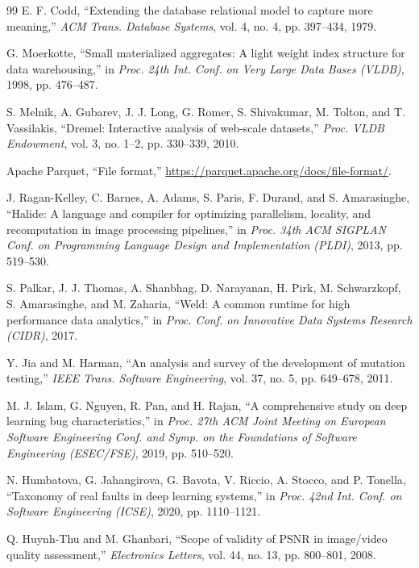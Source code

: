 \documentclass[conference]{IEEEtran}
\begin{document}
\begin{thebibliography}{99}
E. F. Codd, ``Extending the database relational model to capture more meaning,'' \emph{ACM Trans.
Database Systems}, vol. 4, no. 4, pp. 397--434, 1979.

G. Moerkotte, ``Small materialized aggregates: A light weight index structure for data
warehousing,'' in \emph{Proc. 24th Int. Conf. on Very Large Data Bases (VLDB)}, 1998, pp. 476--487.

S. Melnik, A. Gubarev, J. J. Long, G. Romer, S. Shivakumar, M. Tolton, and T. Vassilakis, ``Dremel:
Interactive analysis of web-scale datasets,'' \emph{Proc. VLDB Endowment}, vol. 3, no. 1--2,
pp. 330--339, 2010.

Apache Parquet, ``File format,'' \url{https://parquet.apache.org/docs/file-format/}.

J. Ragan-Kelley, C. Barnes, A. Adams, S. Paris, F. Durand, and S. Amarasinghe, ``Halide: A language
and compiler for optimizing parallelism, locality, and recomputation in image processing
pipelines,'' in \emph{Proc. 34th ACM SIGPLAN Conf. on Programming Language Design and
Implementation (PLDI)}, 2013, pp. 519--530.

S. Palkar, J. J. Thomas, A. Shanbhag, D. Narayanan, H. Pirk, M. Schwarzkopf, S. Amarasinghe, and
M. Zaharia, ``Weld: A common runtime for high performance data analytics,'' in \emph{Proc. Conf. on
Innovative Data Systems Research (CIDR)}, 2017.

Y. Jia and M. Harman, ``An analysis and survey of the development of mutation testing,'' \emph{IEEE
Trans. Software Engineering}, vol. 37, no. 5, pp. 649--678, 2011.

M. J. Islam, G. Nguyen, R. Pan, and H. Rajan, ``A comprehensive study on deep learning bug
characteristics,'' in \emph{Proc. 27th ACM Joint Meeting on European Software Engineering Conf. and
Symp. on the Foundations of Software Engineering (ESEC/FSE)}, 2019, pp. 510--520.

N. Humbatova, G. Jahangirova, G. Bavota, V. Riccio, A. Stocco, and P. Tonella, ``Taxonomy of real
faults in deep learning systems,'' in \emph{Proc. 42nd Int. Conf. on Software Engineering (ICSE)},
2020, pp. 1110--1121.

Q. Huynh-Thu and M. Ghanbari, ``Scope of validity of PSNR in image/video quality assessment,''
\emph{Electronics Letters}, vol. 44, no. 13, pp. 800--801, 2008.


\end{thebibliography}
\end{document}
